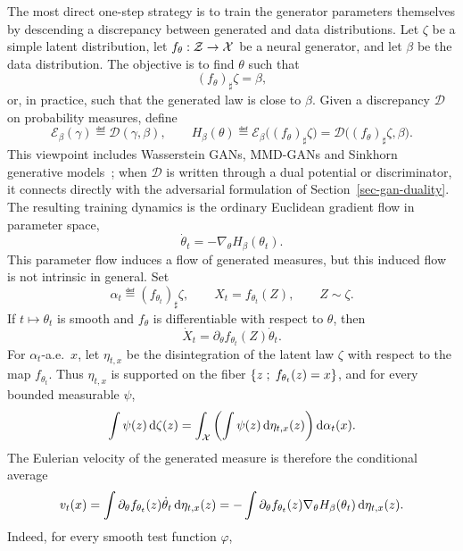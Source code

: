 The most direct one-step strategy is to train the generator parameters themselves by descending a discrepancy between generated and data distributions. Let $\zeta$ be a simple latent distribution, let $f_\theta:\mathcal{Z}\to\mathcal{X}$ be a neural generator, and let $\beta$ be the data distribution. The objective is to find $\theta$ such that
\[
	(f_\theta)_\sharp\zeta=\beta,
\]
or, in practice, such that the generated law is close to $\beta$. Given a discrepancy $\mathcal D$ on probability measures, define
\begin{equation}\label{eq-one-step-parameter-discrepancy}
	\mathcal E_\beta(\gamma)\eqdef\mathcal D(\gamma,\beta),
	\qquad
	H_\beta(\theta)
	\eqdef
	\mathcal E_\beta\big((f_\theta)_\sharp\zeta\big)
	=
	\mathcal D\big((f_\theta)_\sharp\zeta,\beta\big).
\end{equation}
This viewpoint includes Wasserstein GANs, MMD-GANs and Sinkhorn generative models~\cite{WassersteinGAN,MMD-GAN,2017-Genevay-AutoDiff}; when $\mathcal D$ is written through a dual potential or discriminator, it connects directly with the adversarial formulation of Section~\ref{sec-gan-duality}. The resulting training dynamics is the ordinary Euclidean gradient flow in parameter space,
\begin{equation}\label{eq-one-step-parameter-flow}
	\dot\theta_t=-\nabla_\theta H_\beta(\theta_t).
\end{equation}
This parameter flow induces a flow of generated measures, but this induced flow is not intrinsic in general. Set
\[
	\alpha_t\eqdef(f_{\theta_t})_\sharp\zeta,
	\qquad
	X_t=f_{\theta_t}(Z),
	\qquad
	Z\sim\zeta.
\]
If $t\mapsto\theta_t$ is smooth and $f_\theta$ is differentiable with respect to $\theta$, then
\[
	\dot X_t
	=
	\partial_\theta f_{\theta_t}(Z)\dot\theta_t.
\]
For $\alpha_t$-a.e.\ $x$, let $\eta_{t,x}$ be the disintegration of the latent law $\zeta$ with respect to the map $f_{\theta_t}$. Thus $\eta_{t,x}$ is supported on the fiber $\left\{ z \;;\; f_{\theta_t}(z)=x \right\}$, and for every bounded measurable $\psi$,
\[
	\int \psi(z)\,\mathrm{d}\zeta(z)
	=
	\int_{\mathcal{X}}\left(\int \psi(z)\,\mathrm{d}\eta_{t,x}(z)\right)\mathrm{d}\alpha_t(x).
\]
The Eulerian velocity of the generated measure is therefore the conditional average
\begin{equation}\label{eq-one-step-induced-velocity}
	v_t(x)
	=
	\int \partial_\theta f_{\theta_t}(z)\dot\theta_t\,\mathrm{d}\eta_{t,x}(z)
	=
	-\int \partial_\theta f_{\theta_t}(z)\nabla_\theta H_\beta(\theta_t)\,\mathrm{d}\eta_{t,x}(z).
\end{equation}
Indeed, for every smooth test function $\varphi$,

